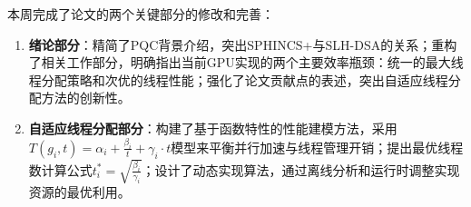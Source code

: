 \documentclass[report]{../../custom}
\begin{document}
本周完成了论文的两个关键部分的修改和完善：

\begin{enumerate}
\item \textbf{绪论部分}：精简了PQC背景介绍，突出SPHINCS+与SLH-DSA的关系；重构了相关工作部分，明确指出当前GPU实现的两个主要效率瓶颈：统一的最大线程分配策略和次优的线程性能；强化了论文贡献点的表述，突出自适应线程分配方法的创新性。

\item \textbf{自适应线程分配部分}：构建了基于函数特性的性能建模方法，采用$T(g_i, t) = \alpha_i + \frac{\beta_i}{t} + \gamma_i \cdot t$模型来平衡并行加速与线程管理开销；提出最优线程数计算公式$t_i^* = \sqrt{\frac{\beta_i}{\gamma_i}}$；设计了动态实现算法，通过离线分析和运行时调整实现资源的最优利用。
\end{enumerate}



\end{document}

